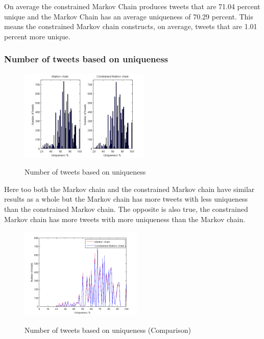 \documentclass[a4paper,12pt]{article}
\begin{document}
 On average the constrained Markov Chain produces tweets that are 71.04 percent unique and the Markov Chain has an average uniqueness of 70.29 percent. This means the constrained Markov chain constructs, on average, tweets that are 1.01 percent more unique.

\newpage
\subsubsection{Number of tweets based on uniqueness}

\begin{figure}[h!]
  \hfill
  {\includegraphics[width=1\linewidth, height = 165]{NumTweetsByUniq.png}}
  \caption{Number of tweets based on uniqueness}
 \end{figure}
 
 Here too both the Markov chain and the constrained Markov chain have similar results as a whole but the Markov chain has more tweets with less uniqueness than the constrained Markov chain. The opposite is also true, the constrained Markov chain has more tweets with more uniqueness than the Markov chain.
 
  \begin{figure}[h!]
   \hfill
  {\includegraphics[width=1\linewidth, height = 165]{NumTweetsByUniq2.png}}
  \hfill
  \caption{Number of tweets based on uniqueness (Comparison)}
 \end{figure}
\end{document}
